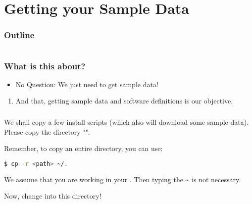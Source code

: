 \section{Getting your Sample Data}

\begin{frame}
	\frametitle{Outline}
	\begin{columns}[t]
		\begin{column}{.5\textwidth}
            \tableofcontents[sections={1-7},currentsection]
		\end{column}
		\begin{column}{.5\textwidth}
            \tableofcontents[sections={8-15},currentsection]
		\end{column}
	\end{columns}
\end{frame}

\begin{frame}
	\frametitle{What is this about?}
	\begin{question}[Questions]\begin{itemize}
			\item No Question: We just need to get sample data!
		\end{itemize}
	\end{question}
	\begin{docs}[Objectives]
		\begin{enumerate}
			\item And that, getting sample data and software definitions is our objective.
		\end{enumerate}
	\end{docs}
\end{frame}

\begin{frame}[fragile]
  \frametitle{}
  We shall copy a few install scripts (which also will download some sample data).\newline
  Please copy the directory "\texttt{}".\newline
  \begin{hint}
  	Remember, to copy an entire directory, you can use:
  	\begin{lstlisting}[language=Bash, style=Shell]
$ cp -r <path> ~/.
  	\end{lstlisting}
    We assume that you are working in your . Then typing the \textasciitilde{} is not necessary.
  \end{hint}
  \pause
  Now, change into this directory!  
\end{frame}

